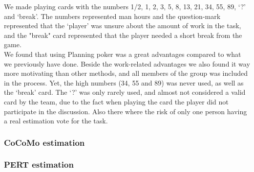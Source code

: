 We made playing cards with the numbers 1/2, 1, 2, 3, 5, 8, 13, 21, 34, 55, 89, `?' and `break'. The numbers represented man hours and the question-mark represented that the `player' was unsure about the amount of work in the task, and the "break" card represented that the player needed a short break from the game.\\
We found that using Planning poker was a great advantages compared to what we previously have done. Beside the work-related advantages we also found it way more motivating than other methods, and all members of the group was included in the process. Yet, the high numbers (34, 55 and 89) was never used, as well as the `break' card. The `?' was only rarely used, and almost not considered a valid card by the team, due to the fact when playing the card the player did not participate in the discussion. Also there where the risk of only one person having a real estimation vote for the task.

\subsubsection{CoCoMo estimation}
\subsubsection{PERT estimation}